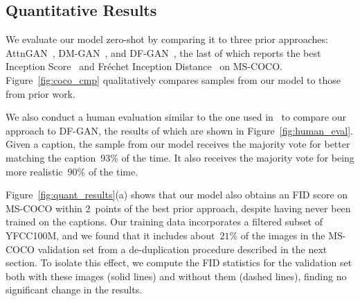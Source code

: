 \documentclass{article}
\begin{document}
\subsection{Quantitative Results}

We evaluate our model zero-shot by comparing it to three prior approaches: AttnGAN~\cite{xu2018attngan}, DM-GAN~\cite{zhu2019dm}, and DF-GAN~\cite{tao2020df}, the last of which reports the best Inception Score~\cite{salimans2016improved} and Fr\'echet Inception Distance~\cite{heusel2017gans} on MS-COCO. Figure~\ref{fig:coco_cmp} qualitatively compares samples from our model to those from prior work.

We also conduct a human evaluation similar to the one used in~\citet{koh2021text} to compare our approach to DF-GAN, the results of which are shown in Figure~\ref{fig:human_eval}. Given a caption, the sample from our model receives the majority vote for better matching the caption~93\% of the time. It also receives the majority vote for being more realistic~90\% of the time.

Figure~\ref{fig:quant_results}(a) shows that our model also obtains an FID score on MS-COCO within 2~points of the best prior approach, despite having never been trained on the captions. Our training data incorporates a filtered subset of YFCC100M, and we found that it includes about~$21\%$ of the images in the MS-COCO validation set from a de-duplication procedure described in the next section. To isolate this effect, we compute the FID statistics for the validation set both with these images (solid lines) and without them (dashed lines), finding no significant change in the results.
\end{document}
